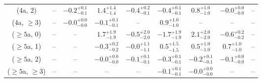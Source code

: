 \begin{table}[h!]
{\begin{tabular}{ccccccccc}
	(4a, 2) & -- & $-0.2^{+ 0.1 }_{- 0.1 }$ & $1.4^{+ 1.4 }_{- 1.4 }$ & $-0.4^{+ 0.2 }_{- 0.1 }$ & $-0.4^{+ 0.1 }_{- 0.1 }$ & $0.8^{+ 1.0 }_{- 1.0 }$ & $-0.0^{+ 0.0 }_{- 0.0 }$ & -- \\[0.5ex] 
	(4a, $\ge3$) & -- & $-0.0^{+ 0.0 }_{- 0.0 }$ & $-0.1^{+ 0.1 }_{- 0.1 }$ & -- & $0.9^{+ 1.0 }_{- 1.0 }$ & -- & -- & -- \\[0.5ex] 
	($\ge5$a, 0) & -- & -- & $1.7^{+ 1.9 }_{- 1.9 }$ & $-0.5^{+ 2.0 }_{- 2.0 }$ & $-1.7^{+ 1.9 }_{- 1.9 }$ & $2.1^{+ 2.0 }_{- 2.0 }$ & $-0.6^{+ 0.2 }_{- 0.2 }$ & -- \\[0.5ex] 
	($\ge5$a, 1) & -- & -- & $-0.3^{+ 0.2 }_{- 0.2 }$ & $-0.0^{+ 1.1 }_{- 1.1 }$ & $0.5^{+ 1.5 }_{- 1.5 }$ & $0.5^{+ 1.0 }_{- 1.0 }$ & $0.7^{+ 1.0 }_{- 1.0 }$ & -- \\[0.5ex] 
	($\ge5$a, 2) & -- & -- & $-0.0^{+ 0.0 }_{- 0.0 }$ & $-0.1^{+ 0.1 }_{- 0.1 }$ & $-0.3^{+ 0.1 }_{- 0.1 }$ & $-0.2^{+ 0.1 }_{- 0.1 }$ & $-0.1^{+ 0.0 }_{- 0.0 }$ & -- \\[0.5ex] 
	($\ge5$a, $\ge3$) & -- & -- & -- & -- & $-0.1^{+ 0.1 }_{- 0.1 }$ & $-0.0^{+ 0.0 }_{- 0.0 }$ & -- & -- \\[0.5ex] 
	\hline
	\hline
\end{tabular}}
\end{table}
